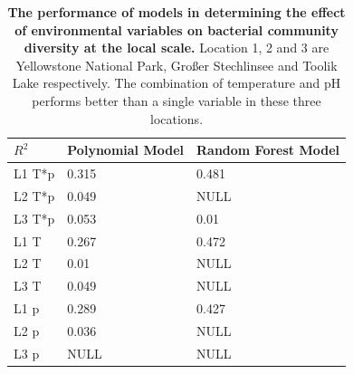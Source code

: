 \documentclass[11pt, a4paper]{article}
\begin{document}
\begin{spacing}{1.5}
\begin{table}
    \caption{{\bf The performance of models in determining the effect of environmental variables on bacterial community diversity at the local scale.} Location 1, 2 and 3 are Yellowstone National Park, Großer Stechlinsee and Toolik Lake respectively. The combination of temperature and pH performs better than a single variable in these three locations.}
    \centering
    \begin{tabular}{ m{1.5cm}<{\centering}m{4cm}<{\centering}m{4cm}<{\centering}} 
     \toprule
     $R^{2}$ & Polynomial Model & Random Forest Model \\
     \midrule
    L1 T*p & 0.315 & 0.481 \\
    L2 T*p & 0.049 & NULL \\
    L3 T*p & 0.053 & 0.01 \\
    L1 T & 0.267 & 0.472 \\
    L2 T & 0.01 & NULL \\
    L3 T & 0.049 & NULL \\
    L1 p & 0.289 & 0.427 \\
    L2 p & 0.036 & NULL \\
    L3 p & NULL & NULL \\
    \bottomrule
    \end{tabular}    
    \label{tab:Shan_localmodels}
\end{table}


\end{spacing}
\end{document}
